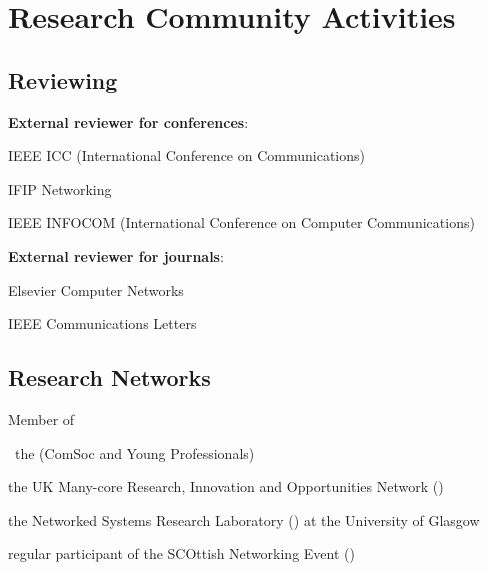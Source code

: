 \section{Research Community Activities}
\subsection{Reviewing}
\begin{cvitemize}
	\item \textbf{External reviewer for conferences}:
	\begin{inlineItemize}
		\item IEEE ICC (International Conference on Communications)
		\item IFIP Networking
		\item IEEE INFOCOM (International Conference on Computer Communications)
	\end{inlineItemize}
	\item \textbf{External reviewer for journals}:
	\begin{inlineItemize}
		\item Elsevier Computer Networks
		\item IEEE Communications Letters
	\end{inlineItemize}
\end{cvitemize}

\subsection{Research Networks}
\begin{cvitemize}
	\item Member of
	\begin{inlineItemize}
		\item \ the  (ComSoc and Young Professionals)
		\item the UK Many-core Research, Innovation and Opportunities Network ()
		\item the Networked Systems Research Laboratory () at the University of Glasgow
		\item regular participant of the SCOttish Networking Event ()
	\end{inlineItemize}
\end{cvitemize}